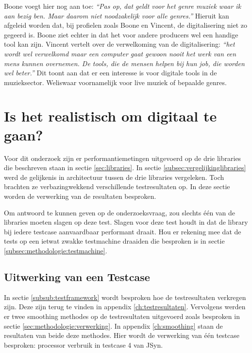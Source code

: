 Boone voegt hier nog aan toe: \textit{``Pas op, dat geldt voor het genre muziek waar ik aan bezig ben. Maar daarom niet noodzakelijk voor alle genres.''} \autocite{peterboone} Hieruit kan afgeleid worden dat, bij profielen zoals Boone en Vincent, de digitalisering niet zo gegeerd is. Boone ziet echter in dat het voor andere producers wel een handige tool kan zijn. Vincent vertelt over de verwelkoming van de digitalisering: \textit{``het wordt wel verwelkomd maar een computer gaat gewoon nooit het werk van een mens kunnen overnemen. De tools, die de mensen helpen bij hun job, die worden wel beter.''} \autocite{bartvincent} Dit toont aan dat er een interesse is voor digitale tools in de muzieksector. Weliswaar voornamelijk voor live muziek of bepaalde genres.

\section{Is het realistisch om digitaal te gaan?}

Voor dit onderzoek zijn er performantiemetingen uitgevoerd op de drie libraries die beschreven staan in sectie \ref{sec:libraries}. In sectie \ref{subsec:vergelijkinglibraries} werd de gelijkenis in architectuur tussen de drie libraries vergeleken. Toch brachten ze verbazingwekkend verschillende testresultaten op. In deze sectie worden de verwerking van de resultaten besproken. 

Om antwoord te kunnen geven op de onderzoeksvraag, zou slechts één van de libraries moeten slagen op deze test. Slagen voor deze test houdt in dat de library bij iedere testcase aanvaardbaar performant draait. Hou er rekening mee dat de tests op een ietwat zwakke testmachine draaiden die besproken is in sectie \ref{subsec:methodologie:testmachine}.

\subsection{Uitwerking van een Testcase}
\label{calctestcase}

In sectie \ref{subsub:testframework} wordt besproken hoe de testresultaten verkregen zijn. Deze zijn terug te vinden in appendix \ref{ch:testresultaten}. Vervolgens werden er twee smoothing methodes op de testresultaten uitgevoerd zoals besproken in sectie \ref{sec:methodologie:verwerking}. In appendix \ref{ch:smoothing} staan de resultaten van beide deze methodes. Hier wordt de verwerking van één testcase besproken: processor verbruik in testcase 4 van JSyn.

